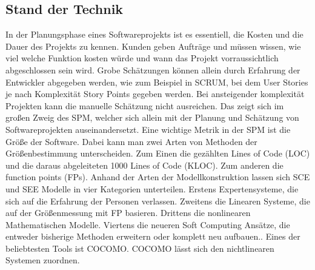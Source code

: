 \subsection{Stand der Technik}
In der Planungsphase eines Softwareprojekts ist es essentiell, die Kosten und die Dauer des Projekts zu kennen. Kunden geben Aufträge und müssen wissen, wie viel welche Funktion kosten würde und wann das Projekt vorraussichtlich abgeschlossen sein wird. Grobe Schätzungen können allein durch Erfahrung der Entwickler abgegeben werden, wie zum Beispiel in SCRUM, bei dem User Stories je nach Komplexität Story Points gegeben werden. Bei ansteigender komplexität Projekten kann die manuelle Schätzung nicht ausreichen. Das zeigt sich im großen Zweig des SPM, welcher sich allein mit der Planung und Schätzung von Softwareprojekten auseinandersetzt. Eine wichtige Metrik in der SPM ist die Größe der Software. Dabei kann man zwei Arten von Methoden der Größenbestimmung unterscheiden. Zum Einen die gezählten Lines of Code (LOC) und die daraus abgeleiteten 1000 Lines of Code (KLOC). Zum anderen die function points (FPs). Anhand der Arten der Modellkonstruktion lassen sich SCE und SEE Modelle in vier Kategorien unterteilen. Erstens Expertensysteme, die sich auf die Erfahrung der Personen verlassen\cite{Heemstra1992}. Zweitens die Linearen Systeme, die auf der Größenmessung mit FP basieren\cite{Matson1994}. Drittens die nonlinearen Mathematischen Modelle. Viertens die neueren Soft Computing Ansätze, die entweder bisherige Methoden erweitern oder komplett neu aufbauen\cite{Huang2007}.\cite{Huang2006}. Eines der beliebtesten Tools ist COCOMO.\cite{Jain2016} COCOMO lässt sich den nichtlinearen Systemen zuordnen.

